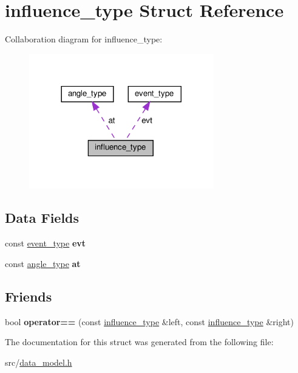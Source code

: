 \hypertarget{structinfluence__type}{}\section{influence\+\_\+type Struct Reference}
\label{structinfluence__type}


Collaboration diagram for influence\+\_\+type\+:\nopagebreak
\begin{figure}[H]
\begin{center}
\leavevmode
\includegraphics[width=228pt]{df/d32/structinfluence__type__coll__graph}
\end{center}
\end{figure}
\subsection*{Data Fields}
\begin{DoxyCompactItemize}
\item 
const \hyperlink{structevent__type}{event\+\_\+type} {\bfseries evt}\hypertarget{structinfluence__type_a54609d8fd03b51d5a1961db4739af731}{}\label{structinfluence__type_a54609d8fd03b51d5a1961db4739af731}

\item 
const \hyperlink{structangle__type}{angle\+\_\+type} {\bfseries at}\hypertarget{structinfluence__type_a1232197d61a8bebc4d5c64ec54745aa3}{}\label{structinfluence__type_a1232197d61a8bebc4d5c64ec54745aa3}

\end{DoxyCompactItemize}
\subsection*{Friends}
\begin{DoxyCompactItemize}
\item 
bool {\bfseries operator==} (const \hyperlink{structinfluence__type}{influence\+\_\+type} \&left, const \hyperlink{structinfluence__type}{influence\+\_\+type} \&right)\hypertarget{structinfluence__type_a4f5b42686b09f580c15f8fa9f3aa296f}{}\label{structinfluence__type_a4f5b42686b09f580c15f8fa9f3aa296f}

\end{DoxyCompactItemize}


The documentation for this struct was generated from the following file\+:\begin{DoxyCompactItemize}
\item 
src/\hyperlink{data__model_8h}{data\+\_\+model.\+h}\end{DoxyCompactItemize}
